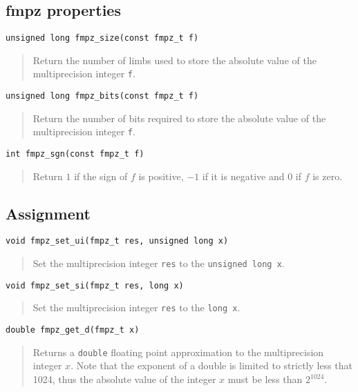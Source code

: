 \documentclass[a4paper,10pt]{article}
\newcommand{\code}{\lstinline}
\begin{document}
\subsection{fmpz properties}

\begin{lstlisting}
unsigned long fmpz_size(const fmpz_t f)
\end{lstlisting}
\begin{quote}
Return the number of limbs used to store the absolute value of the multiprecision integer \code{f}.
\end{quote}

\begin{lstlisting}
unsigned long fmpz_bits(const fmpz_t f)
\end{lstlisting}
\begin{quote}
Return the number of bits required to store the absolute value of the multiprecision integer \code{f}.
\end{quote}

\begin{lstlisting}
int fmpz_sgn(const fmpz_t f)
\end{lstlisting}
\begin{quote}
Return $1$ if the sign of $f$ is positive, $-1$ if it is negative and $0$ if $f$ is zero. 
\end{quote}

\subsection{Assignment}

\begin{lstlisting}
void fmpz_set_ui(fmpz_t res, unsigned long x)
\end{lstlisting}
\begin{quote}
Set the multiprecision integer \code{res} to the \code{unsigned long x}.
\end{quote}

\begin{lstlisting}
void fmpz_set_si(fmpz_t res, long x)
\end{lstlisting}
\begin{quote}
Set the multiprecision integer \code{res} to the \code{long x}.
\end{quote}

\begin{lstlisting}
double fmpz_get_d(fmpz_t x) 
\end{lstlisting}
\begin{quote}
Returns a \code{double} floating point approximation to the multiprecision integer $x$. Note that the exponent of a double is limited to strictly less that 1024, thus the absolute value of the integer $x$ must be less than $2^{1024}$.
\end{quote}
\end{document}

